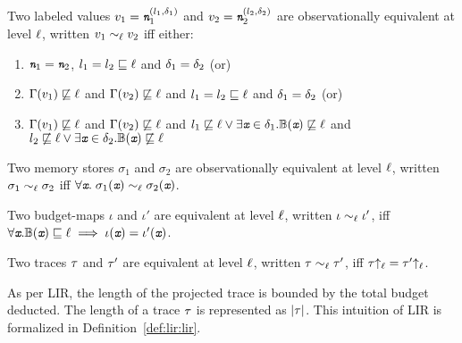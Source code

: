 \begin{mydef}
	\label{def:lir:veq}
	Two labeled values $v_1 = \emph{\texttt{n}}_1^{(l_1,\delta_1)}$ and $v_2 =
	\emph{\texttt{n}}_2^{(l_2,\delta_2)}$ are observationally equivalent at level
	$\ell$, written $v_1\sim_\ell v_2$ iff either:
	\begin{enumerate}
		\item $\emph{\texttt{n}}_1 = \emph{\texttt{n}}_2$, %
		$l_1 = l_2 \sqsubseteq \ell$ and $\delta_1 = \delta_2$ (or)
		\item $\Gamma(v_1) \not\sqsubseteq  \ell$ and $\Gamma(v_2)
		\not\sqsubseteq \ell$ and $l_1 = l_2 \sqsubseteq
		\ell$ and $\delta_1 = \delta_2$
		(or)
		\item $\Gamma(v_1) \not\sqsubseteq  \ell$ and $\Gamma(v_2)
		\not\sqsubseteq \ell$ and $l_1 \not\sqsubseteq
		\ell \vee \exists \emph{\texttt{x}} \in
		\delta_1. \mathbb{B}(\emph{\texttt{x}}) \not\sqsubseteq 
		\ell$ and $l_2 \not\sqsubseteq \ell \vee \exists
		\emph{\texttt{x}} \in   \delta_2. \mathbb{B}(\emph{\texttt{x}}) \not\sqsubseteq
		\ell$ 
	\end{enumerate}
\end{mydef}

\begin{mydef}
	\label{def:lir:seq}
	Two memory stores $\sigma_1$ and $\sigma_2$ are observationally equivalent
	at level $\ell$, written $\sigma_1 \sim_\ell \sigma_2$ iff
	$\forall \emph{\texttt{x}}. \; \sigma_1(\emph{\texttt{x}}) \sim_\ell \sigma_2(\emph{\texttt{x}})$.
\end{mydef}

\begin{mydef}
	\label{def:lir:beq}
	Two budget-maps $\iota$ and $\iota'$ are equivalent at level
	$\ell$, written $\iota \sim_\ell \iota'$, iff
	$\forall \emph{\texttt{x}}. \mathbb{B}(\emph{\texttt{x}}) \sqsubseteq \ell
	\implies \iota(\emph{\texttt{x}}) = \iota'(\emph{\texttt{x}})$.
\end{mydef}

\begin{mydef}
	\label{def:lir:teq}
	Two traces $\tau$ and $\tau'$ are equivalent at level
	$\ell$, written $\tau \sim_\ell \tau'$, iff
	$\tau{\uparrow_\ell} = \tau'{\uparrow_\ell}$.
\end{mydef}

As per LIR, the length of the projected trace is bounded by 
the total budget deducted. The length of a trace $\tau$ is
represented as $|\tau|$. This intuition of LIR is formalized in 
Definition~\ref{def:lir:lir}. 

